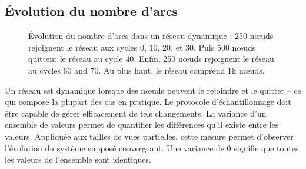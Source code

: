 \subsection{Évolution du nombre d'arcs}
\label{net:subsec:churn}

\begin{figure}
  \centering 
  \hspace{10pt}
  \caption{\label{net:fig:churn} Évolution du nombre d'arcs dans un réseau
    dynamique : 250 nœuds rejoignent le réseau aux cycles $0$, $10$, $20$, et
    $30$. Puis 500 nœuds quittent le réseau au cycle $40$. Enfin, 250 nœuds
    rejoignent le réseau au cycles $60$ and $70$. Au plus haut, le réseau
    comprend 1k nœuds.}
\end{figure}

Un réseau est dynamique lorsque des nœuds peuvent le rejoindre et le quitter --
ce qui compose la plupart des cas en pratique. Le protocole d'échantillonnage
doit être capable de gérer efficacement de tels changements. La variance d'un
ensemble de valeurs permet de quantifier les différences qu'il existe entre les
valeurs. Appliquée aux tailles de vues partielles, cette mesure permet
d'observer l'évolution du système supposé convergeant. Une variance de 0
signifie que toutes les valeurs de l'ensemble sont identiques.

